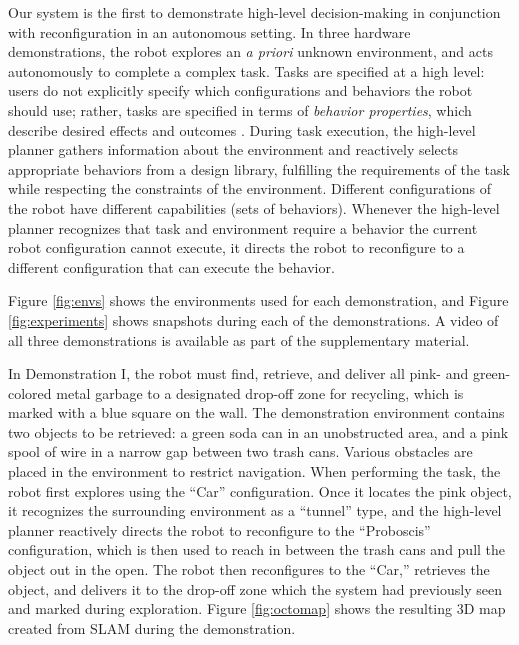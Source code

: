 \documentclass[12pt]{article}
\begin{document}
Our system is the first to demonstrate high-level decision-making in conjunction with reconfiguration in an autonomous setting.  In three hardware demonstrations, the robot explores an \textit{a priori} unknown environment, and acts autonomously to complete a complex task.  Tasks are specified at a high level: users do not explicitly specify which configurations and behaviors the robot should use; rather, tasks are specified in terms of \textit{behavior properties}, which describe desired effects and outcomes \cite{JingAURO2017}.  During task execution, the high-level planner gathers information about the environment and reactively selects appropriate behaviors from a design library, fulfilling the requirements of the task while respecting the constraints of the environment.  Different configurations of the robot have different capabilities (sets of behaviors).  Whenever the high-level planner recognizes that task and environment require a behavior the current robot configuration cannot execute, it directs the robot to reconfigure to a different configuration that can execute the behavior.

Figure \ref{fig:envs} shows the environments used for each demonstration, and Figure \ref{fig:experiments} shows snapshots during each of the demonstrations. A video of all three demonstrations is available as part of the supplementary material.

In Demonstration I, the robot must find, retrieve, and deliver all pink- and green-colored metal garbage to a designated drop-off zone for recycling, which is marked with a blue square on the wall. The demonstration environment contains two objects to be retrieved: a green soda can in an unobstructed area, and a pink spool of wire in a narrow gap between two trash cans. Various obstacles are placed in the environment to restrict navigation. When performing the task, the robot first explores using the ``Car'' configuration. Once it locates the pink object, it recognizes the surrounding environment as a ``tunnel'' type, and the high-level planner reactively directs the robot to reconfigure to the ``Proboscis'' configuration, which is then used to reach in between the trash cans and pull the object out in the open. The robot then reconfigures to the ``Car,'' retrieves the object, and delivers it to the drop-off zone which the system had previously seen and marked during exploration. Figure \ref{fig:octomap} shows the resulting 3D map created from SLAM during the demonstration.
\end{document}
